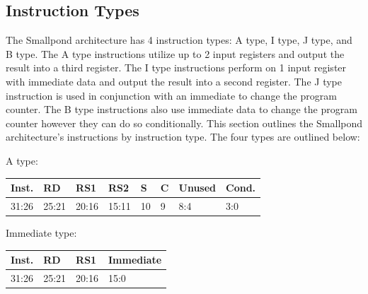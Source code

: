 \documentclass[12pt]{article}
\begin{document}
\newpage

    \subsection{Instruction Types}
        The Smallpond architecture has 4 instruction types: A type, I type, J type, and B type. The A type instructions utilize up to 2 input registers and output the result into a third register. The I type instructions perform on 1 input register with immediate data and output the result into a second register. The J type instruction is used in conjunction with an immediate to change the program counter. The B type instructions also use immediate data to change the program counter however they can do so conditionally. This section outlines the Smallpond architecture's instructions by instruction type. The four types are outlined below:\\
    
        \begin{center}
            A type:\\
            \vspace{1em}
            \begin{tabular}{ |p{1.8cm}|p{1.5cm}|p{1.5cm}|p{1.5cm}|p{0.3cm}|p{0.3cm}|p{1.5cm}|p{1.5cm}| }
                \hline
                \textbf{Inst.} & \textbf{RD}& \textbf{RS1} & \textbf{RS2} & \textbf{S} & \textbf{C} & Unused & \textbf{Cond.}\\
                \hline
                31:26& 25:21 & 20:16 & 15:11 & 10 & 9 & 8:4 &3:0\\
                \hline
            \end{tabular}
        \end{center}
        
        \begin{center}
            Immediate type:\\
            \vspace{1em}
            \begin{tabular}{ |p{1.8cm}|p{1.5cm}|p{1.5cm}|p{6.8cm}| }
                \hline
                \textbf{Inst.} & \textbf{RD} &  \textbf{RS1} & \textbf{Immediate}\\
                \hline
                31:26& 25:21 & 20:16 &15:0\\
                \hline
            \end{tabular}
        \end{center}
        
\end{document}
